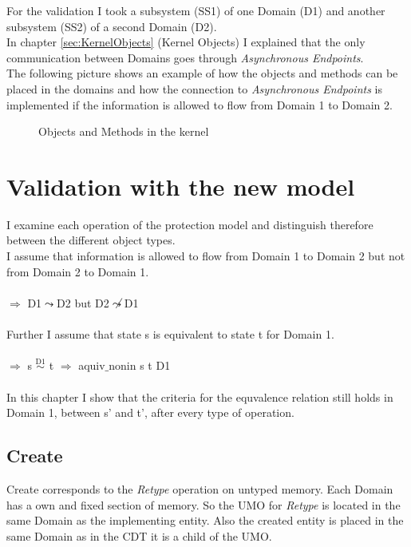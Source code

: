 \documentclass[pdftex,11pt,a4paper,twoside]{article}
\begin{document}
For the validation I took a subsystem (SS1) of one Domain (D1) and another subsystem (SS2) of a second Domain (D2). \\
In chapter \ref{sec:KernelObjects} (Kernel Objects) I explained that the only communication between Domains goes through \textit{Asynchronous Endpoints}. \\
The following picture shows an example of how the objects and methods can be placed in the domains and how the connection to \textit{Asynchronous Endpoints} is implemented if the information is allowed to flow from Domain 1 to Domain 2.
\begin{figure}[H]
\caption{Objects and Methods in the kernel}
\end{figure}
\section{Validation with the new model}\label{sec:ValNew}
I examine each operation of the protection model and distinguish therefore between the different object types. \\
I assume that information is allowed to flow from Domain 1 to Domain 2 but not from Domain 2 to Domain 1. \\ \\
$\Rightarrow$ D1$\leadsto$D2 but D2$\not\leadsto$D1 \\ \\
Further I assume that state s is equivalent to state t for Domain 1. \\ \\
$\Rightarrow$ s $\overset{\text{D1}}{\sim}$ t $\Rightarrow$ aquiv$\_$nonin s t D1	\\ \\
In this chapter I show that the criteria for the equvalence relation still holds in Domain 1, between s' and t', after every type of operation. 
\subsection{Create}\label{sec:Create}
Create corresponds to the \textit{Retype} operation on untyped memory. Each Domain has a own and fixed section of memory. So the UMO for \textit{Retype} is located in the same Domain as the implementing entity. Also the created entity is placed in the same Domain as in the CDT it is a child of the UMO.  
\end{document}
